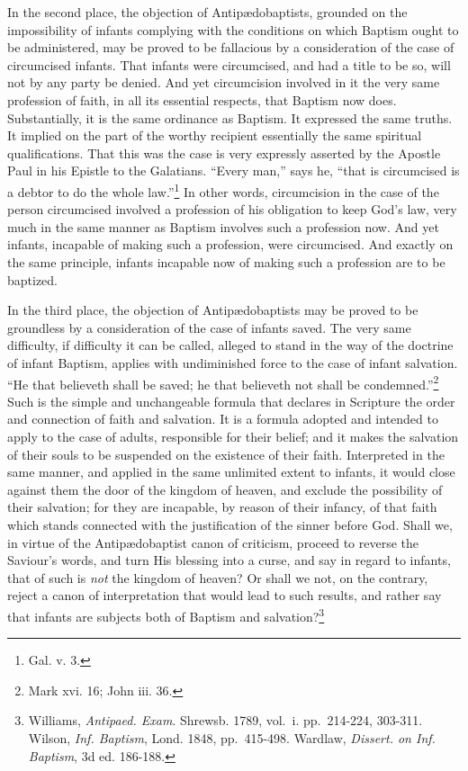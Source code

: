 \documentclass[english,]{book}
\begin{document}
In the second place, the objection of Antipædobaptists, grounded on the impossibility of infants complying with the conditions on which Baptism ought to be administered, may be proved to be fallacious by a consideration of the case of circumcised infants. That infants were circumcised, and had a title to be so, will not by any party be denied. And yet circumcision involved in it the very same profession of faith, in all its essential respects, that Baptism now does. Substantially, it is the same ordinance as Baptism. It expressed the same truths. It implied on the part of the worthy recipient essentially the same spiritual qualifications. That this was the case is very expressly asserted by the Apostle Paul in his Epistle to the Galatians. ``Every man,'' says he, ``that is circumcised is a debtor to do the whole law.''\footnote{Gal. v. 3.} In other words, circumcision in the case of the person circumcised involved a profession of his obligation to keep God's law, very much in the same manner as Baptism involves such a profession now. And yet infants, incapable of making such a profession, were circumcised. And exactly on the same principle, infants incapable now of making such a profession are to be baptized.

In the third place, the objection of Antipædobaptists may be proved to be groundless by a consideration of the case of infants saved. The very same difficulty, if difficulty it can be called, alleged to stand in the way of the doctrine of infant Baptism, applies with undiminished force to the case of infant salvation. ``He that believeth shall be saved; he that believeth not shall be condemned.''\footnote{Mark xvi. 16; John iii. 36.} Such is the simple and unchangeable formula that declares in Scripture the order and connection of faith and salvation. It is a formula adopted and intended to apply to the case of adults, responsible for their belief; and it makes the salvation of their souls to be suspended on the existence of their faith. Interpreted in the same manner, and applied in the same unlimited extent to infants, it would close against them the door of the kingdom of heaven, and exclude the possibility of their salvation; for they are incapable, by reason of their infancy, of that faith which stands connected with the justification of the sinner before God. Shall we, in virtue of the Antipædobaptist canon of criticism, proceed to reverse the Saviour's words, and turn His blessing into a curse, and say in regard to infants, that of such is \emph{not} the kingdom of heaven? Or shall we not, on the contrary, reject a canon of interpretation that would lead to such results, and rather say that infants are subjects both of Baptism and salvation?\footnote{Williams, \emph{Antipaed. Exam}. Shrewsb. 1789, vol.~i. pp.~214-224, 303-311. Wilson, \emph{Inf. Baptism}, Lond. 1848, pp.~415-498. Wardlaw, \emph{Dissert. on Inf. Baptism}, 3d ed. 186-188.}
\end{document}
